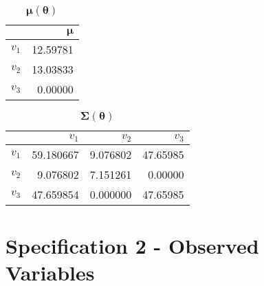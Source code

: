 \documentclass[
]{book}
\newenvironment{Shaded}{\begin{snugshade}}{\end{snugshade}}
\newcommand{\AttributeTok}[1]{\textcolor[rgb]{0.77,0.63,0.00}{#1}}
\newcommand{\ConstantTok}[1]{\textcolor[rgb]{0.00,0.00,0.00}{#1}}
\newcommand{\FunctionTok}[1]{\textcolor[rgb]{0.00,0.00,0.00}{#1}}
\newcommand{\NormalTok}[1]{#1}
\newcommand{\SpecialCharTok}[1]{\textcolor[rgb]{0.00,0.00,0.00}{#1}}
\newcommand{\StringTok}[1]{\textcolor[rgb]{0.31,0.60,0.02}{#1}}
\begin{document}
\begin{table}

\caption{\label{tab:unnamed-chunk-3}$\boldsymbol{\mu} \left( \boldsymbol{\theta} \right)$}
\centering
\begin{tabular}[t]{l|r}
\hline
  & $\boldsymbol{\mu}$\\
\hline
$v_1$ & 12.59781\\
\hline
$v_2$ & 13.03833\\
\hline
$v_3$ & 0.00000\\
\hline
\end{tabular}
\end{table}

\begin{Shaded}
\end{Shaded}

\begin{table}

\caption{\label{tab:unnamed-chunk-4}$\boldsymbol{\Sigma} \left( \boldsymbol{\theta} \right)$}
\centering
\begin{tabular}[t]{l|r|r|r}
\hline
  & $v_1$ & $v_2$ & $v_3$\\
\hline
$v_1$ & 59.180667 & 9.076802 & 47.65985\\
\hline
$v_2$ & 9.076802 & 7.151261 & 0.00000\\
\hline
$v_3$ & 47.659854 & 0.000000 & 47.65985\\
\hline
\end{tabular}
\end{table}

\hypertarget{specification-2---observed-variables}{%
\section{Specification 2 - Observed Variables}\label{specification-2---observed-variables}}
\end{document}
